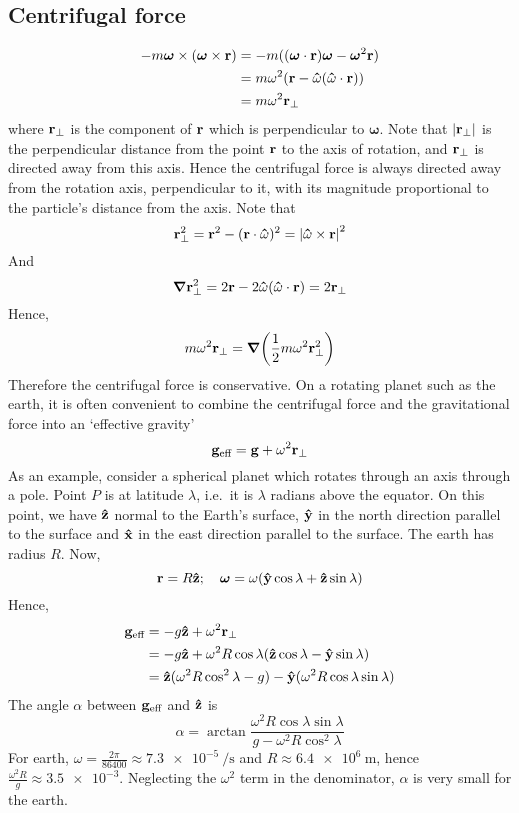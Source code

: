 \subsection{Centrifugal force}
\begin{align*}
	-m\bm\omega \times (\bm\omega \times \vb r) & = -m((\bm\omega \cdot \vb r)\bm\omega - \bm\omega^2\vb r) \\
	                                            & = m\omega^2(\vb r - \vu\omega(\vu\omega \cdot \vb r))     \\
	                                            & = m\omega^2 \vb r_\perp
\end{align*}
where \(\vb r_\perp\) is the component of \(\vb r\) which is perpendicular to \(\bm\omega\).
Note that \(\abs{\vb r_\perp}\) is the perpendicular distance from the point \(\vb r\) to the axis of rotation, and \(\vb r_\perp\) is directed away from this axis.
Hence the centrifugal force is always directed away from the rotation axis, perpendicular to it, with its magnitude proportional to the particle's distance from the axis.
Note that
\[
	\vb r_\perp^2 = \vb r^2 - (\vb r \cdot \vu\omega)^2 = \abs{\vu\omega \times \vb r}^2
\]
And
\[
	\grad \vb r_\perp^2 = 2\vb r - 2\vu\omega(\vu\omega \cdot \vb r) = 2\vb r_\perp
\]
Hence,
\[
	m\omega^2\vb r_\perp = \grad(\frac{1}{2}m\omega^2\vb r_\perp^2)
\]
Therefore the centrifugal force is conservative.
On a rotating planet such as the earth, it is often convenient to combine the centrifugal force and the gravitational force into an `effective gravity'
\[
	\vb g_{\text{eff}} = \vb g + \omega^2 \vb r_\perp
\]
As an example, consider a spherical planet which rotates through an axis through a pole.
Point \(P\) is at latitude \(\lambda\), i.e.\ it is \(\lambda\) radians above the equator.
On this point, we have \(\vu z\) normal to the Earth's surface, \(\vu y\) in the north direction parallel to the surface and \(\vu x\) in the east direction parallel to the surface.
The earth has radius \(R\).
Now,
\[
	\vb r = R\vu z;\quad \bm\omega = \omega(\vu y \cos\lambda + \vu z \sin\lambda)
\]
Hence,
\begin{align*}
	\vb g_\text{eff} & = -g\vu z + \omega^2 \vb r_\perp                                              \\
	                 & = -g\vu z + \omega^2 R\cos\lambda (\vu z \cos\lambda - \vu y \sin\lambda)     \\
	                 & = \vu z(\omega^2 R\cos^2\lambda - g) - \vu y(\omega^2R\cos\lambda\sin\lambda)
\end{align*}
The angle \(\alpha\) between \(\vb g_\text{eff}\) and \(\vu z\) is
\[
	\alpha = \arctan \frac{\omega^2R\cos\lambda\sin\lambda}{g - \omega^2R\cos^2\lambda}
\]
For earth, \(\omega = \frac{2\pi}{86400} \approx \SI{7.3e-5}{\per\second}\) and \(R \approx \SI{6.4e6}{\metre}\), hence \(\frac{\omega^2R}{g} \approx \num{3.5e-3}\).
Neglecting the \(\omega^2\) term in the denominator, \(\alpha\) is very small for the earth.

